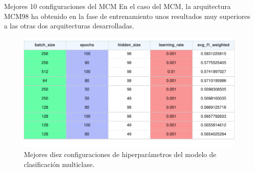 \begin{frame}{Mejores 10 configuraciones del MCM}
En el caso del MCM, la arquitectura MCM98 ha obtenido en la fase de entrenamiento unos resultados muy superiores a las otras dos arquitecturas desarrolladas.
\begin{figure}[H]
    \centering
    \includegraphics[width=1\textwidth]{../Memoria/img/modelo/resultados/MULtop10.pdf}
    \caption{Mejores diez configuraciones de hiperparámetros del modelo de clasificación multiclase.}
    \label{fig:BINtop5}
\end{figure}

\end{frame}




























